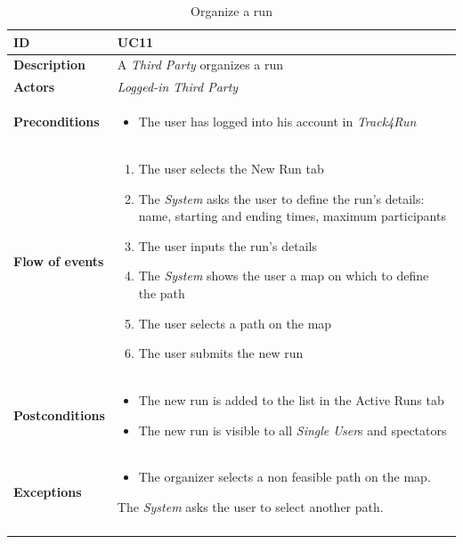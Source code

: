 \documentclass[titlepage]{article}
\begin{document}
\begin{longtable}{| p{3 cm} | p{10 cm} |} 
			\hline
			{\bf ID} & UC11 \\
			\hline
			{\bf Description} & A {\it Third Party} organizes a run  \\
			\hline
			{\bf Actors} & {\it Logged-in {\it Third Party} }\\
			\hline
			{\bf Preconditions} & 		
							\begin{itemize}
								\item The user has logged into his account in {\it Track4Run}
							\end{itemize}
			\\
			\hline
			{\bf Flow of events} & 
							\begin{enumerate}
								\item The user selects the New Run tab
\item The {\it System} asks the user to define the run’s details: name, starting and ending times, maximum participants
\item The user inputs the run’s details
\item The {\it System} shows the user a map on which to define the path
\item The user selects a path on the map
\item The user submits the new run
							\end{enumerate}
			
			 \\
			\hline
			{\bf Postconditions} & 
							\begin{itemize}
								\item The new run is added to the list in the Active Runs tab
\item The new run is visible to all {\it Single User}s and spectators

							\end{itemize}
			\\
			\hline
			{\bf Exceptions} & 
							\begin{itemize}
								\item The organizer selects a non feasible path on the map.
							\end{itemize}
							The {\it System} asks the user to select another path.						
			\\
			\hline
			\caption{Organize a run}
			\end{longtable}
\end{document}
